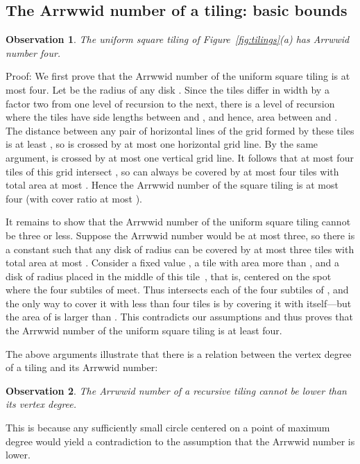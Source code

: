 \documentclass[11pt,a4paper]{article}
\newenvironment{proof}{Proof:}{\qed}
\def\squareforqed{\hbox{\rlap{}}}
\def\qed{\ifmmode\squareforqed\else{\unskip\nobreak\hfil
\penalty50\hskip1em\null\nobreak\hfil\squareforqed
\parfillskip=0pt\finalhyphendemerits=0\endgraf}\fi}
\newtheorem{observation}{Observation}
\begin{document}
\subsection{The Arrwwid number of a tiling: basic bounds}
\begin{observation}\label{ob:squaretiling}
The uniform square tiling of Figure~\ref{fig:tilings}(a) has Arrwwid number four.
\end{observation}
\begin{proof}
We first prove that the Arrwwid number of the uniform square tiling is at most four.
Let  be the radius of any disk . Since the tiles differ in width by a factor two from one level of recursion to the next, there is a level of recursion where the tiles have side lengths between  and , and hence, area between  and . The distance between any pair of horizontal lines of the grid formed by these tiles is at least , so  is crossed by at most one horizontal grid line. By the same argument,  is crossed by at most one vertical grid line. It follows that at most four tiles of this grid intersect , so  can always be covered by at most four tiles with total area at most . Hence the Arrwwid number of the square tiling is at most four (with cover ratio at most ).

It remains to show that the Arrwwid number of the uniform square tiling cannot be three or less. Suppose the Arrwwid number would be at most three, so there is a constant  such that any disk of radius  can be covered by at most three tiles with total area at most . Consider a fixed value , a tile  with area more than , and a disk  of radius  placed in the middle of this tile~, that is, centered on the spot where the four subtiles of  meet. Thus  intersects each of the four subtiles of , and the only way to cover it with less than four tiles is by covering it with  itself---but the area of  is larger than . This contradicts our assumptions and thus proves that the Arrwwid number of the uniform square tiling is at least four.
\end{proof}

The above arguments illustrate that there is a relation between the vertex degree of a tiling and its Arrwwid number:
\begin{observation}
The Arrwwid number of a recursive tiling cannot be lower than its vertex degree.
\end{observation}
This is because any sufficiently small circle centered on a point of maximum degree would yield a contradiction to the assumption that the Arrwwid number is lower.
\end{document}
